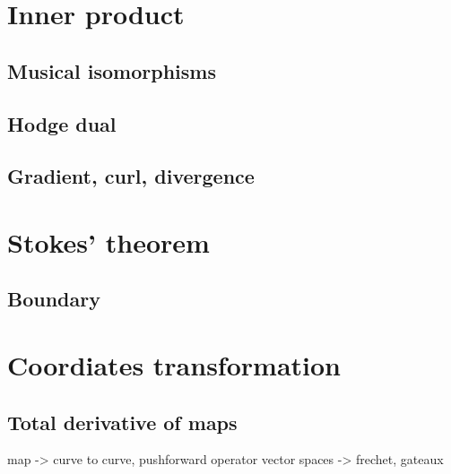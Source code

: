 \documentclass{../exp}
\begin{document}
\section{Inner product}
\subsection{Musical isomorphisms}
\subsection{Hodge dual}
\subsection{Gradient, curl, divergence}















\section{Stokes' theorem}
\subsection{Boundary}







\section{Coordiates transformation}
\subsection{Total derivative of maps}
map -> curve to curve, pushforward operator
vector spaces -> frechet, gateaux
\end{document}
